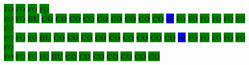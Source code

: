 \colorbox{green}{\color[gray]{0.75}FO}%
\colorbox{green}{\color[gray]{0.75}FO}%
\colorbox{green}{\color[gray]{0.75}FO}%
\colorbox{green}{\color[gray]{0.75}FO}%
\\
\colorbox{green}{\color[gray]{0.75}FO}%
\colorbox{green}{\color[gray]{0.75}FO}%
\colorbox{green}{\color[rgb]{1,0,0}\textbf{BU}}%
\colorbox{green}{\color[rgb]{0,0,0}\textbf{CO}}%
\colorbox{green}{\color[rgb]{0,0,0}\textbf{CO}}%
\colorbox{green}{\color[rgb]{0,0,0}\textbf{CO}}%
\colorbox{green}{\color[rgb]{0,0,0}\textbf{CO}}%
\colorbox{green}{\color[rgb]{0,0,0}\textbf{CO}}%
\colorbox{green}{\color[rgb]{0,0,0}\textbf{CO}}%
\colorbox{green}{\color[rgb]{0,0,0}\textbf{CO}}%
\colorbox{green}{\color[rgb]{0,0,0}\textbf{CO}}%
\colorbox{green}{\color[rgb]{0,0,0}\textbf{CO}}%
\colorbox{blue}{\color[rgb]{1,0,0}\textbf{06}}%
\colorbox{green}{\color[gray]{0.75}FO}%
\colorbox{green}{\color[gray]{0.75}FO}%
\colorbox{green}{\color[gray]{0.75}FO}%
\colorbox{green}{\color[gray]{0.75}FO}%
\colorbox{green}{\color[gray]{0.75}FO}%
\colorbox{green}{\color[gray]{0.75}FO}%
\colorbox{green}{\color[gray]{0.75}FO}%
\\
\colorbox{green}{\color[gray]{0.75}FO}%
\colorbox{green}{\color[gray]{0.75}FO}%
\colorbox{green}{\color[gray]{0.75}FO}%
\colorbox{green}{\color[rgb]{1,0,0}\textbf{BU}}%
\colorbox{green}{\color[rgb]{0,0,0}\textbf{CO}}%
\colorbox{green}{\color[rgb]{0,0,0}\textbf{CO}}%
\colorbox{green}{\color[rgb]{0,0,0}\textbf{CO}}%
\colorbox{green}{\color[rgb]{0,0,0}\textbf{CO}}%
\colorbox{green}{\color[rgb]{0,0,0}\textbf{CO}}%
\colorbox{green}{\color[rgb]{0,0,0}\textbf{CO}}%
\colorbox{green}{\color[rgb]{0,0,0}\textbf{CO}}%
\colorbox{green}{\color[rgb]{0,0,0}\textbf{CO}}%
\colorbox{green}{\color[rgb]{0,0,0}\textbf{CO}}%
\colorbox{blue}{\color[rgb]{1,0,0}\textbf{08}}%
\colorbox{green}{\color[gray]{0.75}FO}%
\colorbox{green}{\color[gray]{0.75}FO}%
\colorbox{green}{\color[gray]{0.75}FO}%
\colorbox{green}{\color[gray]{0.75}FO}%
\colorbox{green}{\color[gray]{0.75}FO}%
\colorbox{green}{\color[gray]{0.75}FO}%
\\
\colorbox{green}{\color[gray]{0.75}FO}%
\colorbox{green}{\color[gray]{0.75}FO}%
\colorbox{green}{\color[gray]{0.75}FO}%
\colorbox{green}{\color[gray]{0.75}FO}%
\colorbox{green}{\color[rgb]{1,0,0}\textbf{BU}}%
\colorbox{green}{\color[rgb]{0,0,0}\textbf{CO}}%
\colorbox{green}{\color[rgb]{0,0,0}\textbf{CO}}%
\colorbox{green}{\color[rgb]{0,0,0}\textbf{CO}}%
\colorbox{green}{\color[rgb]{0,0,0}\textbf{CO}}%
\colorbox{green}{\color[rgb]{0,0,0}\textbf{CO}}%
\colorbox{green}{\color[rgb]{0,0,0}\textbf{CO}}%
\colorbox{green}{\color[rgb]{0,0,0}\textbf{CO}}%
